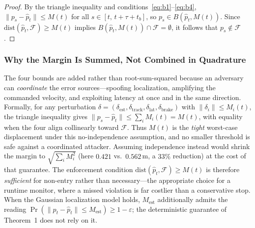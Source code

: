 \documentclass[journal,twoside,web]{ieeecolor}
\begin{document}
\begin{proof}
By the triangle inequality and conditions~\eqref{eq:b1}--\eqref{eq:b4}, $\|p_s - \hat{p}_t\| \le M(t)$ for all $s \in [t,\, t{+}\tau{+}t_b]$, so $p_s \in B(\hat{p}_t, M(t))$. Since $\mathrm{dist}(\hat{p}_t, \mathcal{F}) \ge M(t)$ implies $B(\hat{p}_t, M(t)) \cap \mathcal{F} = \emptyset$, it follows that $p_s \notin \mathcal{F}$.
\end{proof}

\subsubsection{Why the Margin Is Summed, Not Combined in Quadrature}\label{sec:adversarial}
The four bounds are added rather than root-sum-squared because an adversary can \emph{coordinate} the error sources---spoofing localization, amplifying the commanded velocity, and exploiting latency at once and in the same direction. Formally, for any perturbation $\delta=(\delta_{\mathrm{est}},\delta_{\mathrm{track}},\delta_{\mathrm{lat}},\delta_{\mathrm{brake}})$ with $\|\delta_i\|\le M_i(t)$, the triangle inequality gives $\|p_s-\hat p_t\|\le\sum_i M_i(t)=M(t)$, with equality when the four align collinearly toward $\mathcal{F}$. Thus $M(t)$ is the \emph{tight} worst-case displacement under this no-independence assumption, and no smaller threshold is safe against a coordinated attacker. Assuming independence instead would shrink the margin to $\sqrt{\sum_i M_i^2}$ (here $0.421$ vs.\ $0.562$\,m, a $33\%$ reduction) at the cost of that guarantee. The enforcement condition $\mathrm{dist}(\hat p_t,\mathcal F)\ge M(t)$ is therefore \emph{sufficient} for non-entry rather than necessary---the appropriate choice for a runtime monitor, where a missed violation is far costlier than a conservative stop. When the Gaussian localization model holds, $M_{\mathrm{est}}$ additionally admits the reading $\Pr(\|p_t-\hat p_t\|\le M_{\mathrm{est}})\ge 1-\varepsilon$; the deterministic guarantee of Theorem~1 does not rely on it.
\end{document}
